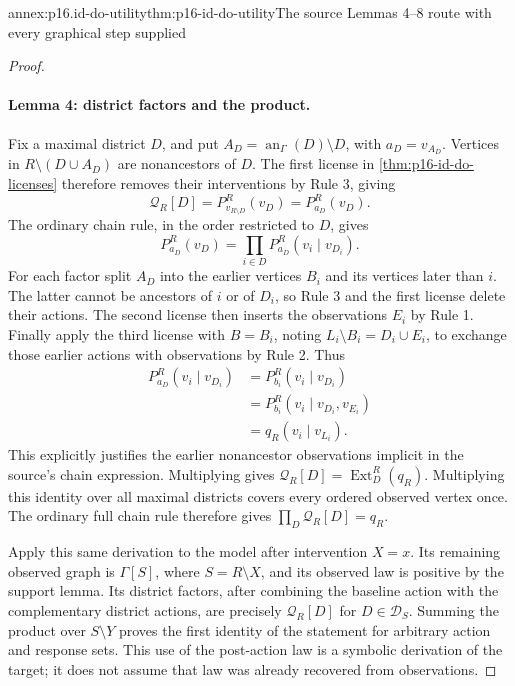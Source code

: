 \begin{annexitem}{annex:p16.id-do-utility}{thm:p16-id-do-utility}{The source Lemmas 4--8 route with every graphical step supplied}
\begin{proof}
\paragraph{Lemma 4: district factors and the product.}
Fix a maximal district \(D\), and put
\(A_D=\operatorname{an}_{\Gamma}(D)\setminus D\), with
\(a_D=v_{A_D}\).
Vertices in \(R\setminus(D\cup A_D)\) are nonancestors of
\(D\). The first license in \cref{thm:p16-id-do-licenses}
therefore removes their interventions by Rule 3, giving
\[
 \mathcal Q_R[D]=P^R_{v_{R\setminus D}}(v_D)=P^R_{a_D}(v_D).
\]
The ordinary chain rule, in the order restricted to \(D\), gives
\[
 P^R_{a_D}(v_D)=\prod_{i\in D}P^R_{a_D}(v_i\mid v_{D_i}).
\]
For each factor split \(A_D\) into the earlier vertices \(B_i\)
and its vertices later than \(i\). The latter cannot be ancestors
of \(i\) or of \(D_i\), so Rule 3 and the first license delete
their actions. The second license then inserts the observations
\(E_i\) by Rule 1. Finally apply the third license with
\(B=B_i\), noting \(L_i\setminus B_i=D_i\cup E_i\), to
exchange those earlier actions with observations by Rule 2. Thus
\[
\begin{aligned}
 P^R_{a_D}(v_i\mid v_{D_i})
 &=P^R_{b_i}(v_i\mid v_{D_i})\\
 &=P^R_{b_i}(v_i\mid v_{D_i},v_{E_i})\\
 &=q_R(v_i\mid v_{L_i}).
\end{aligned}
\]
This explicitly justifies the earlier nonancestor observations implicit
in the source's chain expression. Multiplying gives
\(\mathcal Q_R[D]=\operatorname{Ext}^R_D(q_R)\).
Multiplying this identity over all maximal districts covers every
ordered observed vertex once. The ordinary full chain rule therefore
gives \(\prod_D\mathcal Q_R[D]=q_R\).

Apply this same derivation to the model after intervention \(X=x\).
Its remaining observed graph is \(\Gamma[S]\), where
\(S=R\setminus X\), and its observed law is positive by the
support lemma. Its district factors, after combining the baseline
action with the complementary district actions, are precisely
\(\mathcal Q_R[D]\) for \(D\in\mathcal D_S\). Summing the
product over \(S\setminus Y\) proves the first identity of
the statement for arbitrary action and response sets. This use of
the post-action law is a symbolic derivation of the target; it does
not assume that law was already recovered from observations.


\end{proof}
\end{annexitem}
